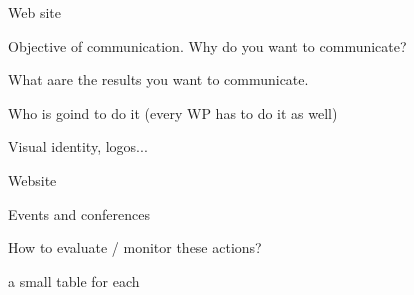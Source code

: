 Web site



Objective of communication. Why do you want to communicate?

What aare the results you want to communicate.

Who is goind to do it (every WP has to do it as well)

Visual identity, logos...

Website

Events and conferences

How to evaluate / monitor these actions?

{\color{red} a small table for each}



